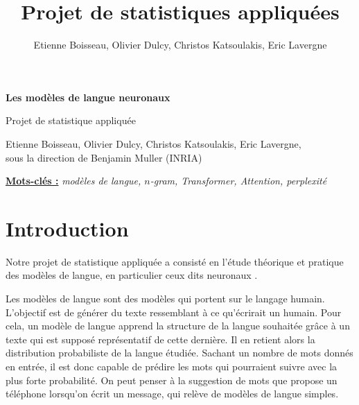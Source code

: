 

\title{Projet de statistiques appliquées}
\author{Etienne Boisseau, Olivier Dulcy, Christos Katsoulakis, Eric Lavergne}
\date{}
\makeatletter

\pagestyle{theme}

\newcommand{\dm}{d_{model}}




   \begin{center}
       \vspace*{1cm}

       {\Huge
       \textbf{Les modèles de langue neuronaux}
       }

       \vspace{0.5cm}

       {\LARGE
       Projet de statistique appliquée
       }

       \vspace{1.5cm}

       Etienne Boisseau, Olivier Dulcy,
       Christos Katsoulakis, Eric Lavergne, \\
       sous la direction de Benjamin Muller (INRIA)
       
   \end{center}
   
\underline{\textbf{Mots-clés :}} \textit{modèles de langue, $n$-gram, Transformer, Attention, perplexité}

\tableofcontents

\newpage

\section*{Introduction}

Notre projet de statistique appliquée a consisté en l'étude théorique et pratique des modèles de langue, en particulier ceux dits \og neuronaux \fg{}.

Les modèles de langue sont des modèles qui portent sur le langage humain. L'objectif est de générer du texte ressemblant à ce qu’écrirait un humain. Pour cela, un modèle de langue apprend la structure de la langue souhaitée grâce à un texte qui est supposé représentatif de cette dernière. Il en retient alors la distribution probabiliste de la langue étudiée. Sachant un nombre de mots donnés en entrée, il est donc capable de prédire les mots qui pourraient suivre avec la plus forte probabilité. On peut penser à la suggestion de mots que propose un téléphone lorsqu'on écrit un message, qui relève de modèles de langue simples.

